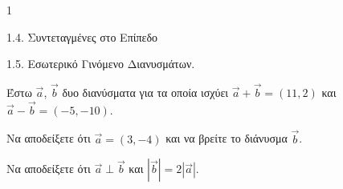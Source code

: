 \begin{ylh}{1}
    \item 1.4. Συντεταγμένες στο Επίπεδο
    \item 1.5. Εσωτερικό Γινόμενο Διανυσμάτων.
\end{ylh}
Έστω $\vec{a}$, $\vec{b}$ δυο διανύσματα για τα οποία ισχύει $\vec{a}+\vec{b}=(11, 2)$ και $\vec{a}-\vec{b}=(-5, -10)$.
\begin{alist}
\item Να αποδείξετε ότι $\vec{a}=(3, -4)$ και να βρείτε το διάνυσμα $\vec{b}$. 
\item Να αποδείξετε ότι $\vec{a} \perp \vec{b}$ και $|\vec{b}|=2|\vec{a}|$. 
\end{alist}